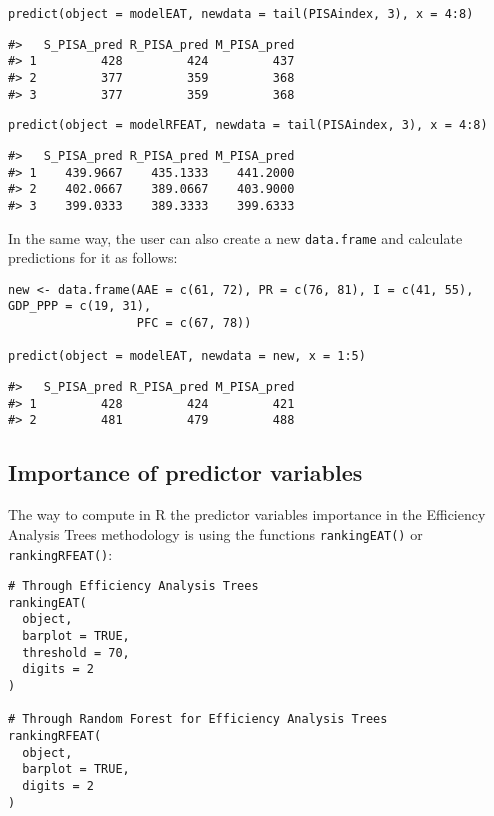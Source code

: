 \begin{verbatim}
predict(object = modelEAT, newdata = tail(PISAindex, 3), x = 4:8)
\end{verbatim}

\begin{verbatim}
#>   S_PISA_pred R_PISA_pred M_PISA_pred
#> 1         428         424         437
#> 2         377         359         368
#> 3         377         359         368
\end{verbatim}

\begin{verbatim}
predict(object = modelRFEAT, newdata = tail(PISAindex, 3), x = 4:8)
\end{verbatim}

\begin{verbatim}
#>   S_PISA_pred R_PISA_pred M_PISA_pred
#> 1    439.9667    435.1333    441.2000
#> 2    402.0667    389.0667    403.9000
#> 3    399.0333    389.3333    399.6333
\end{verbatim}

In the same way, the user can also create a new \texttt{data.frame} and calculate predictions for it as follows:

\begin{verbatim}
new <- data.frame(AAE = c(61, 72), PR = c(76, 81), I = c(41, 55), GDP_PPP = c(19, 31),
                  PFC = c(67, 78))
                  
predict(object = modelEAT, newdata = new, x = 1:5)
\end{verbatim}

\begin{verbatim}
#>   S_PISA_pred R_PISA_pred M_PISA_pred
#> 1         428         424         421
#> 2         481         479         488
\end{verbatim}

\hypertarget{importance-of-predictor-variables}{%
\subsection{Importance of predictor variables}\label{importance-of-predictor-variables}}

The way to compute in R the predictor variables importance in the Efficiency Analysis Trees methodology is using the functions \texttt{rankingEAT()} or \texttt{rankingRFEAT()}:

\begin{verbatim}
# Through Efficiency Analysis Trees
rankingEAT(
  object,
  barplot = TRUE,
  threshold = 70,
  digits = 2
)

# Through Random Forest for Efficiency Analysis Trees
rankingRFEAT(
  object,
  barplot = TRUE,
  digits = 2
)
\end{verbatim}


